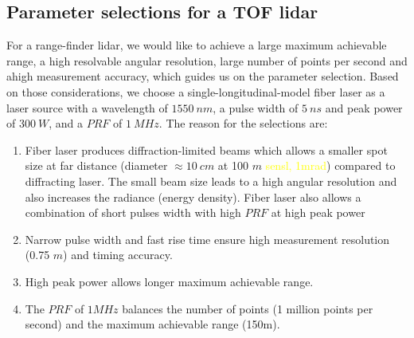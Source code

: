 \subsection{Parameter selections for a TOF lidar}
For a range-finder lidar, we would like to achieve a large maximum achievable range, a high resolvable angular resolution, large number of points per second and  ahigh measurement accuracy, which guides us on the parameter selection. Based on those considerations, we choose a single-longitudinal-model fiber laser as a laser source with a wavelength of $1550~nm$, a pulse width of $5~ns$ and peak power of $300~W$, and a $\mathit{PRF}$ of $1~\mathit{MHz}$. The reason for the selections are: 
\begin{enumerate}
    \item Fiber laser produces diffraction-limited beams which allows a smaller spot size at far distance (diameter $\approx 10~cm$ at 100 $m$ \textcolor{yellow}{sensl, 1mrad}) compared to diffracting laser. The small beam size leads to a high angular resolution and also increases the radiance (energy density). Fiber laser also allows a combination of short pulses width with high $\mathit{PRF}$ at high peak power~\citep{williams2017optimization}
    \item Narrow pulse width and fast rise time ensure high measurement resolution (0.75 $m$) and timing accuracy.
    \item High peak power allows longer maximum achievable range.
    \item The $\mathit{PRF}$ of $1 \mathit{MHz}$ balances the number of points (1 million points per second) and the maximum achievable range (150m).
\end{enumerate}





